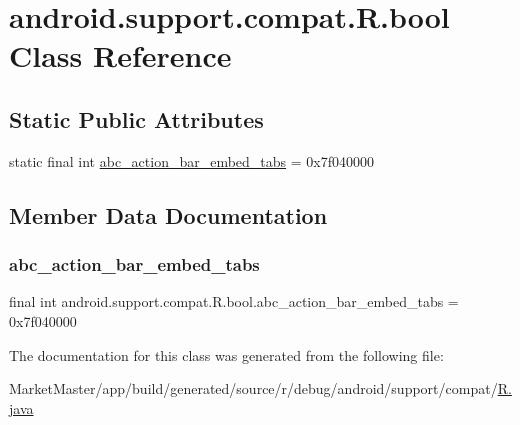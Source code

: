 \hypertarget{classandroid_1_1support_1_1compat_1_1R_1_1bool}{}\section{android.\+support.\+compat.\+R.\+bool Class Reference}
\label{classandroid_1_1support_1_1compat_1_1R_1_1bool}
\subsection*{Static Public Attributes}
\begin{DoxyCompactItemize}
\item 
static final int \mbox{\hyperlink{classandroid_1_1support_1_1compat_1_1R_1_1bool_a2b1c86504041f2552ac19b7856b668f0}{abc\+\_\+action\+\_\+bar\+\_\+embed\+\_\+tabs}} = 0x7f040000
\end{DoxyCompactItemize}


\subsection{Member Data Documentation}
\mbox{\label{classandroid_1_1support_1_1compat_1_1R_1_1bool_a2b1c86504041f2552ac19b7856b668f0}} 
\subsubsection{\texorpdfstring{abc\+\_\+action\+\_\+bar\+\_\+embed\+\_\+tabs}{abc\_action\_bar\_embed\_tabs}}
{\footnotesize\ttfamily final int android.\+support.\+compat.\+R.\+bool.\+abc\+\_\+action\+\_\+bar\+\_\+embed\+\_\+tabs = 0x7f040000\hspace{0.3cm}{\ttfamily [static]}}



The documentation for this class was generated from the following file\+:\begin{DoxyCompactItemize}
\item 
Market\+Master/app/build/generated/source/r/debug/android/support/compat/\mbox{\hyperlink{debug_2android_2support_2compat_2R_8java}{R.\+java}}\end{DoxyCompactItemize}
